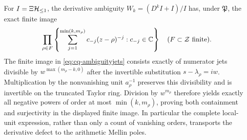 For $I=\Xi\mathcal H_{\leq 1}$, the derivative ambiguity
$W_k=(D^kI+I)/I$ has, under $\mathfrak P$, the exact finite image
\begin{equation}\label{eq:cq-principal-ambiguity}
 \prod_{\rho\in F}
 \left\{\sum_{j=1}^{\min(k,m_\rho)}c_{-j}(z-\rho)^{-j}:c_{-j}\in\mathbb C\right\}
 \quad(F\subset\mathcal Z\text{ finite}).
\end{equation}
The finite image in \eqref{eq:cq-ambiguityjets} consists exactly
of numerator jets divisible by $w^{\max(m_\rho-k,0)}$ after
the invertible substitution $s-\lambda_\rho=iw$.
Multiplication by the nonvanishing unit $a_\rho^{-1}$ preserves
this divisibility and is invertible on the truncated Taylor ring.
Division by $w^{m_\rho}$ therefore yields exactly all negative
powers of order at most $\min(k,m_\rho)$, proving both
containment and surjectivity in the displayed finite image.
In particular the complete local-unit expression, rather than only
a count of vanishing orders, transports the derivative defect to
the arithmetic Mellin poles.


